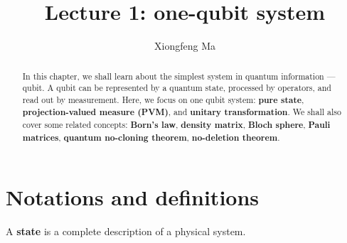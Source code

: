 \documentclass[onecolumn,pra,superscriptaddress,nofootinbib]{revtex4-1}
\begin{document}
\title{Lecture 1: one-qubit system}



\author{Xiongfeng Ma}


\begin{abstract}
In this chapter, we shall learn about the simplest system in quantum information --- qubit. A qubit can be represented by a quantum state, processed by operators, and read out by measurement. Here, we focus on one qubit system: \textbf{pure state}, \textbf{projection-valued measure (PVM)}, and \textbf{unitary transformation}. We shall also cover some related concepts: \textbf{Born's law}, \textbf{density matrix}, \textbf{Bloch sphere}, \textbf{Pauli matrices}, \textbf{quantum no-cloning theorem}, \textbf{no-deletion theorem}.
\end{abstract}



\maketitle %


\section{Notations and definitions}
A \textbf{state} is a complete description of a physical system.
\end{document}
